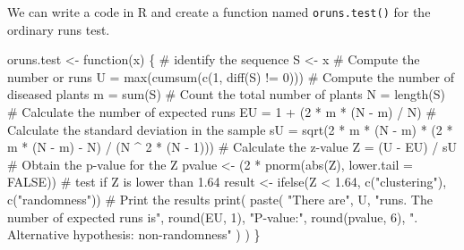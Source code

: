 \documentclass[
  letterpaper,
  DIV=11,
  numbers=noendperiod]{scrreprt}
\newenvironment{Shaded}{\begin{snugshade}}{\end{snugshade}}
\newcommand{\AttributeTok}[1]{\textcolor[rgb]{0.40,0.45,0.13}{#1}}
\newcommand{\CommentTok}[1]{\textcolor[rgb]{0.37,0.37,0.37}{#1}}
\newcommand{\ConstantTok}[1]{\textcolor[rgb]{0.56,0.35,0.01}{#1}}
\newcommand{\ControlFlowTok}[1]{\textcolor[rgb]{0.00,0.23,0.31}{#1}}
\newcommand{\DecValTok}[1]{\textcolor[rgb]{0.68,0.00,0.00}{#1}}
\newcommand{\FloatTok}[1]{\textcolor[rgb]{0.68,0.00,0.00}{#1}}
\newcommand{\FunctionTok}[1]{\textcolor[rgb]{0.28,0.35,0.67}{#1}}
\newcommand{\NormalTok}[1]{\textcolor[rgb]{0.00,0.23,0.31}{#1}}
\newcommand{\OtherTok}[1]{\textcolor[rgb]{0.00,0.23,0.31}{#1}}
\newcommand{\SpecialCharTok}[1]{\textcolor[rgb]{0.37,0.37,0.37}{#1}}
\newcommand{\StringTok}[1]{\textcolor[rgb]{0.13,0.47,0.30}{#1}}
\begin{document}
We can write a code in R and create a function named
\texttt{oruns.test()} for the ordinary runs test.

\begin{Shaded}
\begin{Highlighting}[]
\NormalTok{oruns.test }\OtherTok{\textless{}{-}} \ControlFlowTok{function}\NormalTok{(x) \{}
  \CommentTok{\# identify the sequence}
\NormalTok{  S }\OtherTok{\textless{}{-}}\NormalTok{ x}
  \CommentTok{\# Compute the number or runs}
\NormalTok{  U }\OtherTok{=} \FunctionTok{max}\NormalTok{(}\FunctionTok{cumsum}\NormalTok{(}\FunctionTok{c}\NormalTok{(}\DecValTok{1}\NormalTok{, }\FunctionTok{diff}\NormalTok{(S) }\SpecialCharTok{!=} \DecValTok{0}\NormalTok{)))}
  \CommentTok{\# Compute the number of diseased plants}
\NormalTok{  m }\OtherTok{=} \FunctionTok{sum}\NormalTok{(S)}
  \CommentTok{\# Count the total number of plants}
\NormalTok{  N }\OtherTok{=} \FunctionTok{length}\NormalTok{(S)}
  \CommentTok{\# Calculate the number of expected runs}
\NormalTok{  EU }\OtherTok{=} \DecValTok{1} \SpecialCharTok{+}\NormalTok{ (}\DecValTok{2} \SpecialCharTok{*}\NormalTok{ m }\SpecialCharTok{*}\NormalTok{ (N }\SpecialCharTok{{-}}\NormalTok{ m) }\SpecialCharTok{/}\NormalTok{ N)}
  \CommentTok{\# Calculate the standard deviation in the sample}
\NormalTok{  sU }\OtherTok{=} \FunctionTok{sqrt}\NormalTok{(}\DecValTok{2} \SpecialCharTok{*}\NormalTok{ m }\SpecialCharTok{*}\NormalTok{ (N }\SpecialCharTok{{-}}\NormalTok{ m) }\SpecialCharTok{*}\NormalTok{ (}\DecValTok{2} \SpecialCharTok{*}\NormalTok{ m }\SpecialCharTok{*}\NormalTok{ (N }\SpecialCharTok{{-}}\NormalTok{ m) }\SpecialCharTok{{-}}\NormalTok{ N) }\SpecialCharTok{/}\NormalTok{ (N }\SpecialCharTok{\^{}} \DecValTok{2} \SpecialCharTok{*}\NormalTok{ (N }\SpecialCharTok{{-}} \DecValTok{1}\NormalTok{)))}
  \CommentTok{\# Calculate the z{-}value}
\NormalTok{  Z }\OtherTok{=}\NormalTok{ (U }\SpecialCharTok{{-}}\NormalTok{ EU) }\SpecialCharTok{/}\NormalTok{ sU}
  \CommentTok{\# Obtain the p{-}value for the Z}
\NormalTok{  pvalue }\OtherTok{\textless{}{-}}\NormalTok{ (}\DecValTok{2} \SpecialCharTok{*} \FunctionTok{pnorm}\NormalTok{(}\FunctionTok{abs}\NormalTok{(Z), }\AttributeTok{lower.tail =} \ConstantTok{FALSE}\NormalTok{))}
  \CommentTok{\# test if Z is lower than 1.64}
\NormalTok{  result }\OtherTok{\textless{}{-}} \FunctionTok{ifelse}\NormalTok{(Z }\SpecialCharTok{\textless{}} \FloatTok{1.64}\NormalTok{,}
                   \FunctionTok{c}\NormalTok{(}\StringTok{"clustering"}\NormalTok{),}
                   \FunctionTok{c}\NormalTok{(}\StringTok{"randomness"}\NormalTok{))}
  \CommentTok{\# Print the results}
  \FunctionTok{print}\NormalTok{(}
    \FunctionTok{paste}\NormalTok{(}
      \StringTok{"There are"}\NormalTok{,}
\NormalTok{      U,}
      \StringTok{"runs. The number of expected runs is"}\NormalTok{,}
      \FunctionTok{round}\NormalTok{(EU, }\DecValTok{1}\NormalTok{),}
      \StringTok{"P{-}value:"}\NormalTok{,}
      \FunctionTok{round}\NormalTok{(pvalue, }\DecValTok{6}\NormalTok{),}
      \StringTok{". Alternative hypothesis: non{-}randomness"}
\NormalTok{    )}
\NormalTok{  )}
\NormalTok{\}}
\end{Highlighting}
\end{Shaded}
\end{document}
